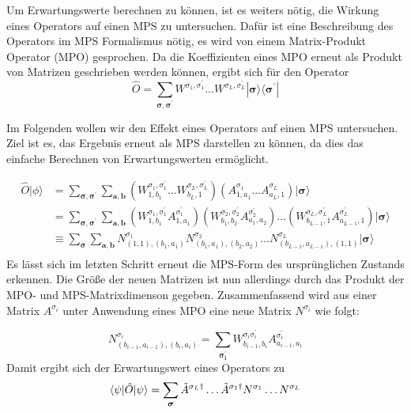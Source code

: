 \documentclass[10pt,a4paper]{report}
\begin{document}
Um Erwartungswerte berechnen zu können, ist es weiters nötig, die Wirkung eines Operators auf einen MPS zu untersuchen. Dafür ist eine Beschreibung des Operators im MPS Formalismus nötig, es wird von einem Matrix-Produkt Operator (MPO) gesprochen. Da die Koeffizienten eines MPO erneut als Produkt von Matrizen geschrieben werden können, ergibt sich für den Operator
\begin{equation}
\hat{O}=\sum_{\bm{\sigma},\bm{\sigma^\prime}}W^{\sigma_1,\sigma_1^\prime}\ldots W^{\sigma_L,\sigma_L^\prime} |\bm{\sigma}\rangle\langle\bm{\sigma^\prime}|
\end{equation}

Im Folgenden wollen wir den Effekt eines Operators auf einen MPS untersuchen. Ziel ist es, das Ergebnis erneut als MPS darstellen zu können, da dies das einfache Berechnen von Erwartungswerten ermöglicht.

\begin{equation}\label{MPO_MPS_equ}
\begin{split}
\hat{O}|\phi\rangle & = \sum_{\bm{\sigma},\bm{\sigma^\prime}}\sum_{\bm{a},\bm{b}}(W_{1,b_1}^{\sigma_1,\sigma_1^\prime}\ldots W_{b_L,1}^{\sigma_L,\sigma_L^\prime})(A_{1,a_1}^{\sigma_1}\ldots A_{a_L,1}^{\sigma_L})|\bm{\sigma}\rangle \\
& =\sum_{\bm{\sigma},\bm{\sigma^\prime}}\sum_{\bm{a},\bm{b}}(W_{1,b_1}^{\sigma_1,\sigma_1^\prime}A_{1,a_1}^{\sigma_1^\prime})(W_{b_1,b_2}^{\sigma_2,\sigma_2^\prime}A_{a_1,a_2}^{\sigma_2^\prime})\ldots(W_{b_{L-1},1}^{\sigma_L,\sigma_L^\prime}A_{a_{L-1},1}^{\sigma_L^\prime})|\bm{\sigma}\rangle \\
&\equiv\sum_{\bm{\sigma}}\sum_{\bm{a},\bm{b}}N_{(1,1),(b_1,a_1)}^{\sigma_1}N_{(b_1,a_1),(b_2,a_2)}^{\sigma_2}\ldots N_{(b_{L-1},a_{L-1}),(1,1)}^{\sigma_L}|\bm{\sigma}\rangle \\
\end{split}
\end{equation}
Es lässt sich im letzten Schritt erneut die MPS-Form des ursprünglichen Zustands erkennen. Die Größe der neuen Matrizen ist nun allerdings durch das Produkt der MPO- und MPS-Matrixdimenson gegeben. Zusammenfassend wird aus einer Matrix $A^{\sigma_i}$ unter Anwendung eines MPO eine neue Matrix $N^{\sigma_i}$ wie folgt:

\begin{equation}
N_{(b_{i-1},a_{i-1}),(b_i,a_i)}^{\sigma_i}=\sum_{\bm{\sigma_i^\prime}}W_{b_{i-1},b_i}^{\sigma_i\sigma_i^\prime}A_{a_{i-1},a_i}^{\sigma_i^\prime}
\end{equation}
Damit ergibt sich der Erwartungswert eines Operators zu
\begin{equation}
\langle\psi|\hat{O}|\psi\rangle=\sum_{\bm{\sigma}}\tilde{A}^{\sigma_L \dagger}\ldots\tilde{A}^{\sigma_1 \dagger} N^{\sigma_1}\ldots N^{\sigma_L}\\
\end{equation}
\end{document}
